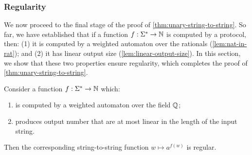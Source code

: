 \subsubsection{Regularity}
\label{sec:regularity-of-string-to-number}
We now proceed to the final stage of the proof of \cref{thm:unary-string-to-string}. So far, we have established that if a function $f : \Sigma^* \to {\mathbb N}$ is computed by a protocol, then: (1) it is computed by a weighted automaton over the rationals (\cref{lem:nat-in-rat}); and (2) it has linear output size (\cref{lem:linear-output-size}). In this section, we show that these two properties ensure regularity, which completes the proof of \cref{thm:unary-string-to-string}.
\begin{lemma}
    Consider a function $f : \Sigma^* \to {\mathbb N}$ which:
    \begin{enumerate}
        \item is computed by a weighted automaton over the field ${\mathbb Q}$;
        \item produces  output number that are at most linear in the length of the input string.
    \end{enumerate}
    Then the corresponding string-to-string function $w \mapsto a^{f(w)}$ is regular. 
\end{lemma}

